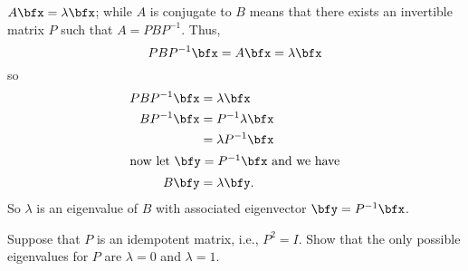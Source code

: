 \begin{questions}
\begin{solution}
    $A\bfx=\lambda\bfx$; while $A$ is conjugate to $B$ means that there
    exists an invertible matrix $P$ such that $A=PBP^{-1}$. Thus,
    \[
      PBP^{-1}\bfx=A\bfx=\lambda\bfx
    \]
    so
    \begin{align*}
      PBP^{-1}\bfx
      &=\lambda\bfx\\
      BP^{-1}\bfx&=P^{-1}\lambda\bfx\\
      &=\lambda P^{-1}\bfx\\
      \intertext{now let $\bfy=P^{-1}\bfx$ and we have}
      B\bfy&=\lambda\bfy.
    \end{align*}
    So $\lambda$ is an eigenvalue of $B$ with associated eigenvector
    $\bfy=P^{-1}\bfx$.
  \end{solution}
  \vspace{1.25in}
  \question[8] Suppose that $P$ is an idempotent matrix, i.e., $P^2=I$. Show
  that the only possible eigenvalues for $P$ are $\lambda=0$ and $\lambda=1$.
\end{questions}
